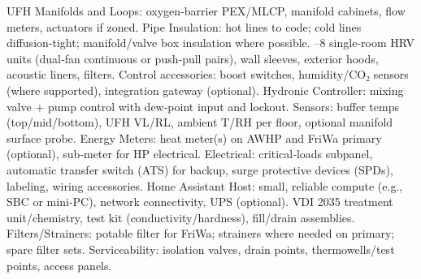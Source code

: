 {}\markdownRendererUlBeginTight
\markdownRendererUlItem UFH Manifolds and Loops: oxygen‑barrier PEX/MLCP, manifold cabinets, flow meters, actuators if zoned.\markdownRendererUlItemEnd 
\markdownRendererUlItem Pipe Insulation: hot lines to code; cold lines diffusion‑tight; manifold/valve box insulation where possible.\markdownRendererUlItemEnd 
\markdownRendererUlEndTight \markdownRendererInterblockSeparator
{}
\markdownRendererSectionEnd \markdownRendererSectionBegin
{}\markdownRendererInterblockSeparator
{}\markdownRendererUlBeginTight
{}–8 single‑room HRV units (dual‑fan continuous or push‑pull pairs), wall sleeves, exterior hoods, acoustic liners, filters.\markdownRendererUlItemEnd 
\markdownRendererUlItem Control accessories: boost switches, humidity/CO₂ sensors (where supported), integration gateway (optional).\markdownRendererUlItemEnd 
\markdownRendererUlEndTight \markdownRendererInterblockSeparator
{}
\markdownRendererSectionEnd \markdownRendererSectionBegin
{}\markdownRendererInterblockSeparator
{}\markdownRendererUlBeginTight
\markdownRendererUlItem Hydronic Controller: mixing valve + pump control with dew‑point input and lockout.\markdownRendererUlItemEnd 
\markdownRendererUlItem Sensors: buffer temps (top/mid/bottom), UFH VL/RL, ambient T/RH per floor, optional manifold surface probe.\markdownRendererUlItemEnd 
\markdownRendererUlItem Energy Meters: heat meter(s) on AWHP and FriWa primary (optional), sub‑meter for HP electrical.\markdownRendererUlItemEnd 
\markdownRendererUlItem Electrical: critical‑loads subpanel, automatic transfer switch (ATS) for backup, surge protective devices (SPDs), labeling, wiring accessories.\markdownRendererUlItemEnd 
\markdownRendererUlItem Home Assistant Host: small, reliable compute (e.g., SBC or mini‑PC), network connectivity, UPS (optional).\markdownRendererUlItemEnd 
\markdownRendererUlEndTight \markdownRendererInterblockSeparator
{}
\markdownRendererSectionEnd \markdownRendererSectionBegin
{}\markdownRendererInterblockSeparator
{}\markdownRendererUlBeginTight
\markdownRendererUlItem VDI 2035 treatment unit/chemistry, test kit (conductivity/hardness), fill/drain assemblies.\markdownRendererUlItemEnd 
\markdownRendererUlItem Filters/Strainers: potable filter for FriWa; strainers where needed on primary; spare filter sets.\markdownRendererUlItemEnd 
\markdownRendererUlItem Serviceability: isolation valves, drain points, thermowells/test points, access panels.\markdownRendererUlItemEnd 
\markdownRendererUlEndTight 
\markdownRendererSectionEnd 
\markdownRendererSectionEnd \markdownRendererDocumentEnd